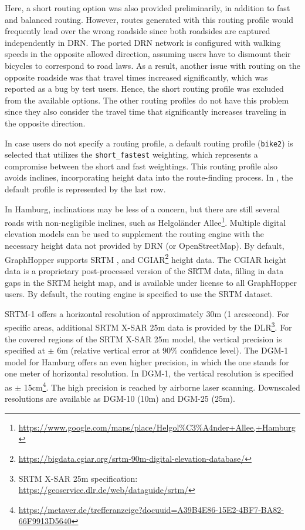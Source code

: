 Here, a short routing option was also provided preliminarily, in addition to fast and balanced routing. However, routes generated with this routing profile would frequently lead over the wrong roadside since both roadsides are captured independently in DRN. The ported DRN network is configured with walking speeds in the opposite allowed direction, assuming users have to dismount their bicycles to correspond to road laws. As a result, another issue with routing on the opposite roadside was that travel times increased significantly, which was reported as a bug by test users. Hence, the short routing profile was excluded from the available options. The other routing profiles do not have this problem since they also consider the travel time that significantly increases traveling in the opposite direction.

In case users do not specify a routing profile, a default routing profile (\texttt{bike2}) is selected that utilizes the \texttt{short\_fastest} weighting, which represents a compromise between the short and fast weightings. This routing profile also avoids inclines, incorporating height data into the route-finding process. In , the default profile is represented by the last row.

In Hamburg, inclinations may be less of a concern, but there are still several roads with non-negligible inclines, such as Helgoländer Allee\footnote{\url{https://www.google.com/maps/place/Helgol\%C3\%A4nder+Allee,+Hamburg}}. Multiple digital elevation models can be used to supplement the routing engine with the necessary height data not provided by DRN (or OpenStreetMap). By default, GraphHopper supports SRTM \cite{farr_shuttle_2000, farr_shuttle_2007}, and CGIAR\footnote{\url{https://bigdata.cgiar.org/srtm-90m-digital-elevation-database/}} height data. The CGIAR height data is a proprietary post-processed version of the SRTM data, filling in data gaps in the SRTM height map, and is available under license to all GraphHopper users. By default, the routing engine is specified to use the SRTM dataset.

SRTM-1 offers a horizontal resolution of approximately 30m (1 arcsecond). For specific areas, additional SRTM X-SAR 25m data is provided by the DLR\footnote{SRTM X-SAR 25m specification: \url{https://geoservice.dlr.de/web/dataguide/srtm/}}. For the covered regions of the SRTM X-SAR 25m model, the vertical precision is specified at $\pm$ 6m (relative vertical error at 90\% confidence level). The DGM-1 model for Hamburg offers an even higher precision, in which the one stands for one meter of horizontal resolution. In DGM-1, the vertical resolution is specified as $\pm$ 15cm\footnote{\url{https://metaver.de/trefferanzeige?docuuid=A39B4E86-15E2-4BF7-BA82-66F9913D5640}}. The high precision is reached by airborne laser scanning. Downscaled resolutions are available as DGM-10 (10m) and DGM-25 (25m).

